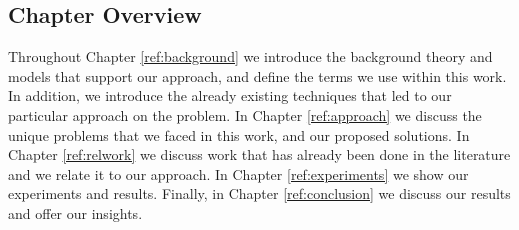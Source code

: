 %
%
%

\subsection{Chapter Overview}
Throughout Chapter \ref{ref:background} we introduce the background theory and models that support
our approach, and define the terms we use within this work. In addition, we introduce the already
existing techniques that led to our particular approach on the problem. In Chapter
\ref{ref:approach} we discuss the unique problems that we faced in this work, and our proposed
solutions. In Chapter \ref{ref:relwork} we discuss work that has already been done in the literature
and we relate it to our approach. In Chapter \ref{ref:experiments} we show our experiments and
results. Finally, in Chapter \ref{ref:conclusion} we discuss our results and offer our insights.

